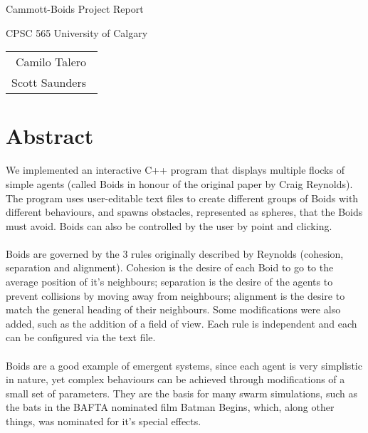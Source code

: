 \documentclass[12pt]{article}
\begin{document}
\thispagestyle{empty}
\begin{titlepage}
	\null\vfill
	
	\begin{center}
		
		{\Huge Cammott-Boids Project Report}
		\vskip 2cm
		
		{\large CPSC 565 University of Calgary}
	\end{center}
	
	\vfill
	\vfill
	
	\begin{tabular}{r}
		Camilo Talero\ \\
		Scott Saunders\    
	\end{tabular}
	\hfill
\end{titlepage}

	
\newpage
\clearpage
\setcounter{page}{1}

\section*{Abstract}

\indent We implemented an interactive C++ program that displays multiple flocks of simple agents (called Boids in honour of the original paper by Craig Reynolds). The program uses user-editable text files to create different groups of Boids with different behaviours, and spawns obstacles, represented as spheres, that the Boids must avoid. Boids can also be controlled by the user by point and clicking.
\\ \\
Boids are governed by the 3 rules originally described by Reynolds (cohesion, separation and alignment). Cohesion is the desire of each Boid to go to the average position of it's neighbours; separation is the desire of the agents to prevent collisions by moving away from neighbours; alignment is the desire to match the general heading of their neighbours. Some modifications were also added, such as the addition of a field of view. Each rule is independent and each can be configured via the text file.
\\ \\
Boids are a good example of emergent systems, since each agent is very simplistic in nature, yet complex behaviours can be achieved through modifications of a small set of parameters. They are the basis for many swarm simulations, such as the bats in the BAFTA nominated film Batman Begins, which, along other things, was nominated for it's special effects.
\end{document}
